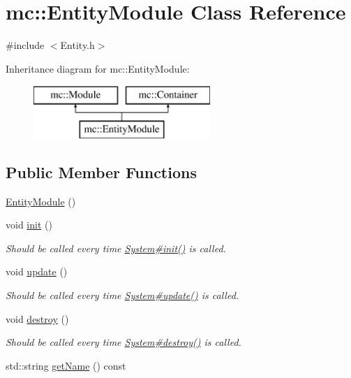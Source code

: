 \hypertarget{classmc_1_1_entity_module}{}\section{mc\+:\+:Entity\+Module Class Reference}
\label{classmc_1_1_entity_module}


{\ttfamily \#include $<$Entity.\+h$>$}

Inheritance diagram for mc\+:\+:Entity\+Module\+:\begin{figure}[H]
\begin{center}
\leavevmode
\includegraphics[height=2.000000cm]{dd/d2e/classmc_1_1_entity_module}
\end{center}
\end{figure}
\subsection*{Public Member Functions}
\begin{DoxyCompactItemize}
\item 
\hyperlink{classmc_1_1_entity_module_a38694a974571e19a231b4a62427259cf}{Entity\+Module} ()
\item 
void \hyperlink{classmc_1_1_entity_module_a5e1f25e0d12c50f6e8d8fbdf31028b8e}{init} ()
\begin{DoxyCompactList}\small\item\em Should be called every time \hyperlink{classmc_1_1_system_a86b7559895967af432c5c3db728bd0bc}{System\#init()} is called. \end{DoxyCompactList}\item 
void \hyperlink{classmc_1_1_entity_module_a3307eb2ce5af81b6a6e26fdaa12e3063}{update} ()
\begin{DoxyCompactList}\small\item\em Should be called every time \hyperlink{classmc_1_1_system_a90e14e44eb5a6019c913a6a197deb4a0}{System\#update()} is called. \end{DoxyCompactList}\item 
void \hyperlink{classmc_1_1_entity_module_a6c0fe0216850bb703df6721940f78b5f}{destroy} ()
\begin{DoxyCompactList}\small\item\em Should be called every time \hyperlink{}{System\#destroy()} is called. \end{DoxyCompactList}\item 
std\+::string \hyperlink{classmc_1_1_entity_module_aa943b1cfb590b01ce6f8a2d749a505bd}{get\+Name} () const 
\end{DoxyCompactItemize}

